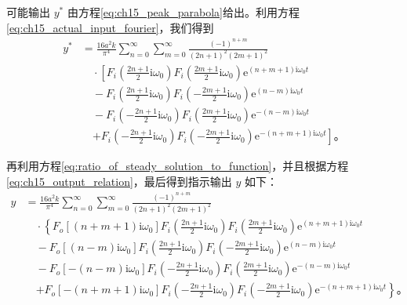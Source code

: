 可能输出 $y^*$ 由方程\eqref{eq:ch15_peak_parabola}给出。利用方程\eqref{eq:ch15_actual_input_fourier}，我们得到
\begin{equation}\label{eq:ch15_y_star}
\begin{aligned}
y^* &= \frac{16a^2k}{\pi^4}\sum_{n=0}^\infty \sum_{m=0}^\infty \frac{(-1)^{n+m}}{(2n+1)^2(2m+1)^2} \\
&\quad \cdot \left[F_i\left(\frac{2n+1}{2}\mathrm{i}\omega_0\right)F_i\left(\frac{2m+1}{2}\mathrm{i}\omega_0\right)\mathrm{e}^{(n+m+1)\mathrm{i}\omega_0 t}\right. \\
&\quad - F_i\left(\frac{2n+1}{2}\mathrm{i}\omega_0\right)F_i\left(-\frac{2m+1}{2}\mathrm{i}\omega_0\right)\mathrm{e}^{(n-m)\mathrm{i}\omega_0 t} \\
&\quad - F_i\left(-\frac{2n+1}{2}\mathrm{i}\omega_0\right)F_i\left(\frac{2m+1}{2}\mathrm{i}\omega_0\right)\mathrm{e}^{-(n-m)\mathrm{i}\omega_0 t} \\
&\quad \left. + F_i\left(-\frac{2n+1}{2}\mathrm{i}\omega_0\right)F_i\left(-\frac{2m+1}{2}\mathrm{i}\omega_0\right)\mathrm{e}^{-(n+m+1)\mathrm{i}\omega_0 t}\right]。
\end{aligned}
\end{equation}

再利用方程\eqref{eq:ratio_of_steady_solution_to_function}，并且根据方程\eqref{eq:ch15_output_relation}，最后得到指示输出 $y$ 如下：
\begin{equation}
\begin{aligned}
y &= \frac{16a^2k}{\pi^4}\sum_{n=0}^\infty \sum_{m=0}^\infty \frac{(-1)^{n+m}}{(2n+1)^2(2m+1)^2} \\
&\quad \cdot \left\{F_o\left[(n+m+1)\mathrm{i}\omega_0\right]F_i\left(\frac{2n+1}{2}\mathrm{i}\omega_0\right)F_i\left(\frac{2m+1}{2}\mathrm{i}\omega_0\right)\mathrm{e}^{(n+m+1)\mathrm{i}\omega_0 t}\right. \\
&\quad - F_o\left[(n-m)\mathrm{i}\omega_0\right]F_i\left(\frac{2n+1}{2}\mathrm{i}\omega_0\right)F_i\left(-\frac{2m+1}{2}\mathrm{i}\omega_0\right)\mathrm{e}^{(n-m)\mathrm{i}\omega_0 t} \\
&\quad - F_o\left[-(n-m)\mathrm{i}\omega_0\right]F_i\left(-\frac{2n+1}{2}\mathrm{i}\omega_0\right)F_i\left(\frac{2m+1}{2}\mathrm{i}\omega_0\right)\mathrm{e}^{-(n-m)\mathrm{i}\omega_0 t} \\
&\quad \left. + F_o\left[-(n+m+1)\mathrm{i}\omega_0\right]F_i\left(-\frac{2n+1}{2}\mathrm{i}\omega_0\right)F_i\left(-\frac{2m+1}{2}\mathrm{i}\omega_0\right)\mathrm{e}^{-(n+m+1)\mathrm{i}\omega_0 t}\right\}。
\end{aligned}
\label{eq:ch15_actual_output_fourier}
\end{equation}

